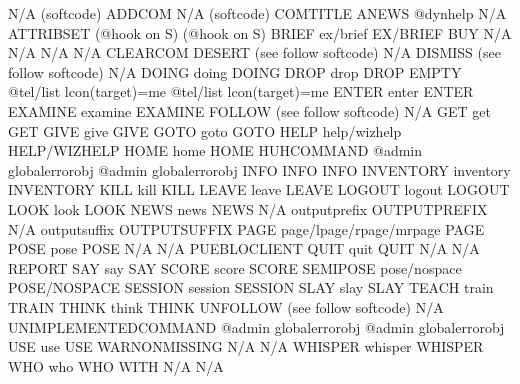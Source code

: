 \documentclass[letterpaper,10pt,english]{sphinxmanual}
\begin{document}
\begin{sphinxVerbatim}[commandchars=\\\{\}]
N/A                     (softcode)                     ADDCOM
N/A                     (softcode)                     COMTITLE
ANEWS                   @dynhelp                       N/A
ATTRIB\PYGZus{}SET              (@hook on S)                   (@hook on S)
BRIEF                   ex/brief                       EX/BRIEF
BUY                     N/A                            N/A
N/A                     N/A                            CLEARCOM
DESERT                  (see follow softcode)          N/A
DISMISS                 (see follow softcode)          N/A
DOING                   doing                          DOING
DROP                    drop                           DROP
EMPTY                   @tel/list lcon(target)=me      @tel/list lcon(target)=me
ENTER                   enter                          ENTER
EXAMINE                 examine                        EXAMINE
FOLLOW                  (see follow softcode)          N/A
GET                     get                            GET
GIVE                    give                           GIVE
GOTO                    goto                           GOTO
HELP                    help/wizhelp                   HELP/WIZHELP
HOME                    home                           HOME
HUH\PYGZus{}COMMAND             @admin global\PYGZus{}error\PYGZus{}obj        @admin global\PYGZus{}error\PYGZus{}obj
INFO                    INFO                           INFO
INVENTORY               inventory                      INVENTORY
KILL                    kill                           KILL
LEAVE                   leave                          LEAVE
LOGOUT                  logout                         LOGOUT
LOOK                    look                           LOOK
NEWS                    news                           NEWS
N/A                     outputprefix                   OUTPUTPREFIX
N/A                     outputsuffix                   OUTPUTSUFFIX
PAGE                    page/lpage/rpage/mrpage        PAGE
POSE                    pose                           POSE
N/A                     N/A                            PUEBLOCLIENT
QUIT                    quit                           QUIT
N/A                     N/A                            REPORT
SAY                     say                            SAY
SCORE                   score                          SCORE
SEMIPOSE                pose/nospace                   POSE/NOSPACE
SESSION                 session                        SESSION
SLAY                    slay                           SLAY
TEACH                   train                          TRAIN
THINK                   think                          THINK
UNFOLLOW                (see follow softcode)          N/A
UNIMPLEMENTED\PYGZus{}COMMAND   @admin global\PYGZus{}error\PYGZus{}obj        @admin global\PYGZus{}error\PYGZus{}obj
USE                     use                            USE
WARN\PYGZus{}ON\PYGZus{}MISSING         N/A                            N/A
WHISPER                 whisper                        WHISPER
WHO                     who                            WHO
WITH                    N/A                            N/A
\end{sphinxVerbatim}
\end{document}
